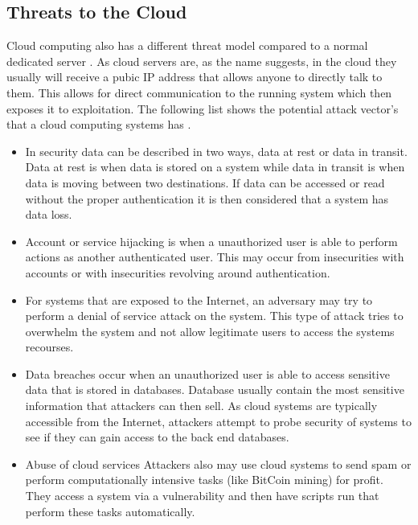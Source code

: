 \documentclass[12pt]{article}
\begin{document}
\subsection{Threats to the Cloud}
Cloud computing also has a different threat model compared to a normal dedicated server \cite{zissis2012addressing, mishra2013cloud, krutz2010cloud}. As cloud servers are, as the name suggests, in the cloud they usually will receive a pubic IP address that allows anyone to directly talk to them. This allows for direct communication to the running system which then exposes it to exploitation. The following list shows the potential attack vector's that a cloud computing systems has \cite{amini2015threat}.

\begin{itemize}
    \item In security data can be described in two ways, data at rest or data in transit. Data at rest is when data is stored on a system while data in transit is when data is moving between two destinations. If data can be accessed or read without the proper authentication it is then considered that a system has data loss.
    \item Account or service hijacking is when a unauthorized user is able to perform actions as another authenticated user. This may occur from insecurities with accounts or with insecurities revolving around authentication.
    \item For systems that are exposed to the Internet, an adversary may try to perform a denial of service attack on the system. This type of attack tries to overwhelm the system and not allow legitimate users to access the systems recourses.
    \item Data breaches occur when an unauthorized user is able to access sensitive data that is stored in databases. Database usually contain the most sensitive information that attackers can then sell. As cloud systems are typically accessible from the Internet, attackers attempt to probe security of systems to see if they can gain access to the back end databases.
    \item Abuse of cloud services Attackers also may use cloud systems to send spam or perform computationally intensive tasks (like BitCoin mining) for profit. They access a system via a vulnerability and then have scripts run that perform these tasks automatically.
\end{itemize}
\end{document}

